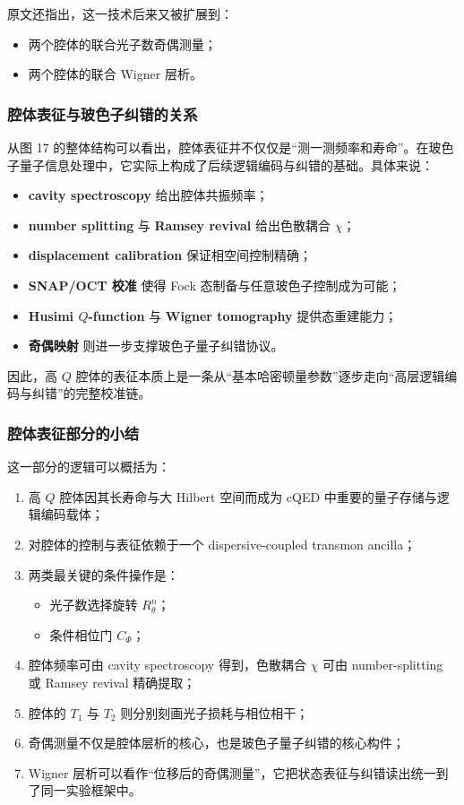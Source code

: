 \documentclass[12pt,a4paper,oneside]{ctexbook}
\begin{document}
原文还指出，这一技术后来又被扩展到：
\begin{itemize}
    \item 两个腔体的联合光子数奇偶测量；
    \item 两个腔体的联合 Wigner 层析。
\end{itemize}

\subsubsection{腔体表征与玻色子纠错的关系}

从图 17 的整体结构可以看出，腔体表征并不仅仅是“测一测频率和寿命”。在玻色子量子信息处理中，它实际上构成了后续逻辑编码与纠错的基础。具体来说：

\begin{itemize}
    \item \textbf{cavity spectroscopy} 给出腔体共振频率；
    \item \textbf{number splitting} 与 \textbf{Ramsey revival} 给出色散耦合 \(\chi\)；
    \item \textbf{displacement calibration} 保证相空间控制精确；
    \item \textbf{SNAP/OCT 校准} 使得 Fock 态制备与任意玻色子控制成为可能；
    \item \textbf{Husimi \(Q\)-function} 与 \textbf{Wigner tomography} 提供态重建能力；
    \item \textbf{奇偶映射} 则进一步支撑玻色子量子纠错协议。
\end{itemize}

因此，高 \(Q\) 腔体的表征本质上是一条从“基本哈密顿量参数”逐步走向“高层逻辑编码与纠错”的完整校准链。

\subsubsection{腔体表征部分的小结}

这一部分的逻辑可以概括为：

\begin{enumerate}
    \item 高 \(Q\) 腔体因其长寿命与大 Hilbert 空间而成为 cQED 中重要的量子存储与逻辑编码载体；
    \item 对腔体的控制与表征依赖于一个 dispersive-coupled transmon ancilla；
    \item 两类最关键的条件操作是：
    \begin{itemize}
        \item 光子数选择旋转 \(R_\theta^n\)；
        \item 条件相位门 \(C_\Phi\)；
    \end{itemize}
    \item 腔体频率可由 cavity spectroscopy 得到，色散耦合 \(\chi\) 可由 number-splitting 或 Ramsey revival 精确提取；
    \item 腔体的 \(T_1\) 与 \(T_2\) 则分别刻画光子损耗与相位相干；
    \item 奇偶测量不仅是腔体层析的核心，也是玻色子量子纠错的核心构件；
    \item Wigner 层析可以看作“位移后的奇偶测量”，它把状态表征与纠错读出统一到了同一实验框架中。
\end{enumerate}
\end{document}
